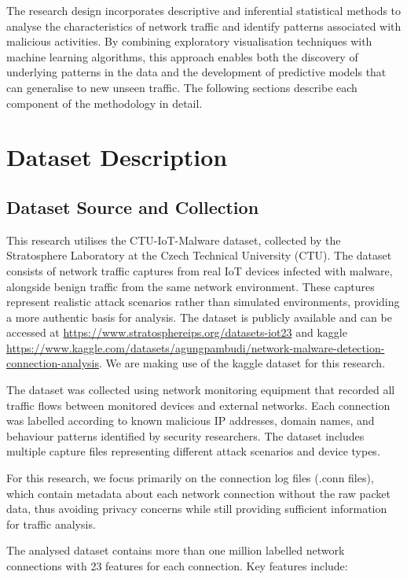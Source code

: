 The research design incorporates descriptive and inferential statistical methods to analyse the characteristics of network traffic and identify patterns associated with malicious activities. By combining exploratory visualisation techniques with machine learning algorithms, this approach enables both the discovery of underlying patterns in the data and the development of predictive models that can generalise to new unseen traffic. The following sections describe each component of the methodology in detail.

\section{Dataset Description}

\subsection{Dataset Source and Collection}

This research utilises the CTU-IoT-Malware dataset, collected by the Stratosphere Laboratory at the Czech Technical University (CTU). The dataset consists of network traffic captures from real IoT devices infected with malware, alongside benign traffic from the same network environment. These captures represent realistic attack scenarios rather than simulated environments, providing a more authentic basis for analysis. The dataset is publicly available and can be accessed at \url{https://www.stratosphereips.org/datasets-iot23} and kaggle \url{https://www.kaggle.com/datasets/agungpambudi/network-malware-detection-connection-analysis}. We are making use of the kaggle dataset for this research.

The dataset was collected using network monitoring equipment that recorded all traffic flows between monitored devices and external networks. Each connection was labelled according to known malicious IP addresses, domain names, and behaviour patterns identified by security researchers. The dataset includes multiple capture files representing different attack scenarios and device types.

For this research, we focus primarily on the connection log files (.conn files), which contain metadata about each network connection without the raw packet data, thus avoiding privacy concerns while still providing sufficient information for traffic analysis.

The analysed dataset contains more than one million labelled network connections with 23 features for each connection. Key features include:


